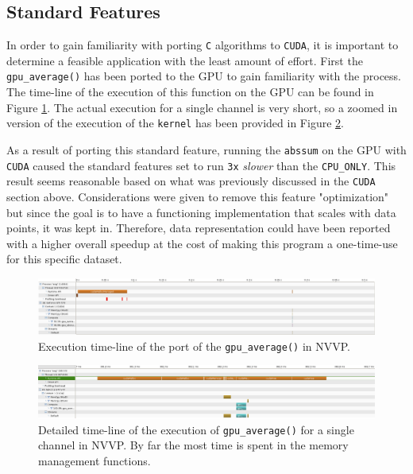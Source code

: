 \documentclass[a4paper]{article}
\begin{document}
\subsection{Standard Features}

In order to gain familiarity with porting \texttt{C} algorithms to \texttt{CUDA}, it is important to determine a feasible application with the least amount of effort. First the \texttt{gpu\_average()} has been ported to the GPU to gain familiarity with the process. The time-line of the execution of this function on the GPU can be found in Figure \ref{fig:GPU_avg}. The actual execution for a single channel is very short, so a zoomed in version of the execution of the \texttt{kernel} has been provided in Figure \ref{fig:GPU_avg_detail}.

As a result of porting this standard feature, running the \texttt{abssum} on the GPU with \texttt{CUDA} caused the standard features set to run \texttt{3x} \textit{slower} than the \texttt{CPU\_ONLY}. This result seems reasonable based on what was previously discussed in the \texttt{CUDA} section above. Considerations were given to remove this feature "optimization" but since the goal is to have a functioning implementation that scales with data points, it was kept in. Therefore, data representation could have been reported with a higher overall speedup at the cost of making this program a one-time-use for this specific dataset. 

\begin{figure}[H]
\begin{center}
\includegraphics[scale=0.35]{images/07_cuda_startup.PNG}
\caption{Execution time-line of the port of the \texttt{gpu\_average()} in NVVP.}
\label{fig:GPU_avg}
\end{center}
\end{figure}

\begin{figure}[H]
\begin{center}
\includegraphics[scale=0.35]{images/06_detail_cudaMallocManaged.PNG}
\caption{Detailed time-line of the execution of \texttt{gpu\_average()} for a single channel in NVVP. By far the most time is spent in the memory management functions.}
\label{fig:GPU_avg_detail}
\end{center}
\end{figure}
\end{document}
